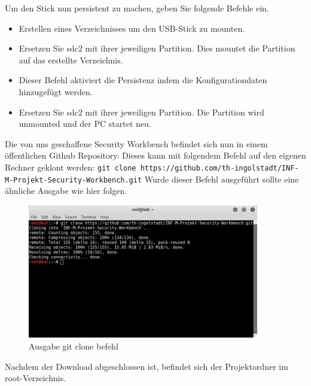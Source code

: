 Um den Stick nun persistent zu machen, geben Sie folgende Befehle ein.
\begin{itemize}
	\item {} Erstellen eines Verzeichnisses um den USB-Stick zu mounten.
	\item {} Ersetzen Sie sdc2 mit ihrer jeweiligen Partition. Dies mountet die Partition auf das erstellte Verzeichnis.
	\item {} Dieser Befehl aktiviert die Persistenz indem die Konfigurationdaten hinzugefügt werden.
	\item {}  Ersetzen Sie sdc2 mit ihrer jeweiligen Partition. Die Partition wird unmounted und der PC startet neu.
\end{itemize}

Die von uns geschaffene Security Workbench befindet sich nun in einem öffentlichen Github Repository. Dieses kann mit folgendem Befehl auf den eigenen Rechner geklont werden:
\colorbox{altgray}{\lstinline|git clone https://github.com/th-ingolstadt/INF-M-Projekt-Security-Workbench.git|}
Wurde dieser Befehl ausgeführt sollte eine ähnliche Ausgabe wie hier folgen.

	\begin{figure}[H]
		\centering
		\includegraphics[width=0.9\textwidth]{images/prep/git_clone.png}
		\caption{Ausgabe git clone befehl}
		\label{fig:git clone output}
	\end{figure}
Nachdem der Download abgeschlossen ist, befindet sich der Projektordner im root-Verzeichnis.

